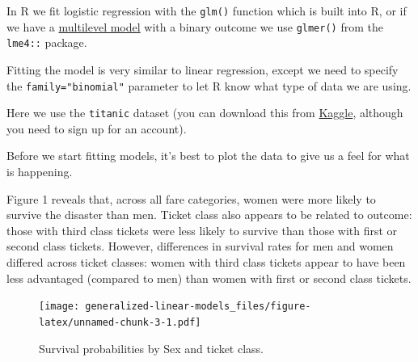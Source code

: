 \documentclass[]{article}
\newenvironment{Shaded}{\begin{snugshade}}{\end{snugshade}}
\newcommand{\DataTypeTok}[1]{\textcolor[rgb]{0.13,0.29,0.53}{#1}}
\newcommand{\KeywordTok}[1]{\textcolor[rgb]{0.13,0.29,0.53}{\textbf{#1}}}
\newcommand{\NormalTok}[1]{#1}
\newcommand{\OperatorTok}[1]{\textcolor[rgb]{0.81,0.36,0.00}{\textbf{#1}}}
\newcommand{\StringTok}[1]{\textcolor[rgb]{0.31,0.60,0.02}{#1}}
\begin{document}
In R we fit logistic regression with the \texttt{glm()} function which is built into R,
or if we have a \protect\hyperlink{multilevel-models}{multilevel model} with a binary outcome we
use \texttt{glmer()} from the \texttt{lme4::} package.

Fitting the model is very similar to linear regression, except we need to
specify the \texttt{family="binomial"} parameter to let R know what type of data we are
using.

Here we use the \texttt{titanic} dataset (you can download this from
\href{https://www.kaggle.com/c/titanic/data}{Kaggle}, although you need to sign up
for an account).

Before we start fitting models, it's best to plot the data to give us a feel for
what is happening.

{Figure 1 reveals that, across all fare categories, women were more likely to
survive the disaster than men. Ticket class also appears to be related to
outcome: those with third class tickets were less likely to survive than those
with first or second class tickets. However, differences in survival rates for
men and women differed across ticket classes: women with third class tickets
appear to have been less advantaged (compared to men) than women with first or
second class tickets.}

\begin{Shaded}
\end{Shaded}

\begin{figure}
\centering
\texttt{[image: generalized-linear-models\_files/figure-latex/unnamed-chunk-3-1.pdf]}
\caption{\label{fig:unnamed-chunk-3}Survival probabilities by Sex and ticket class.}
\end{figure}
\end{document}
